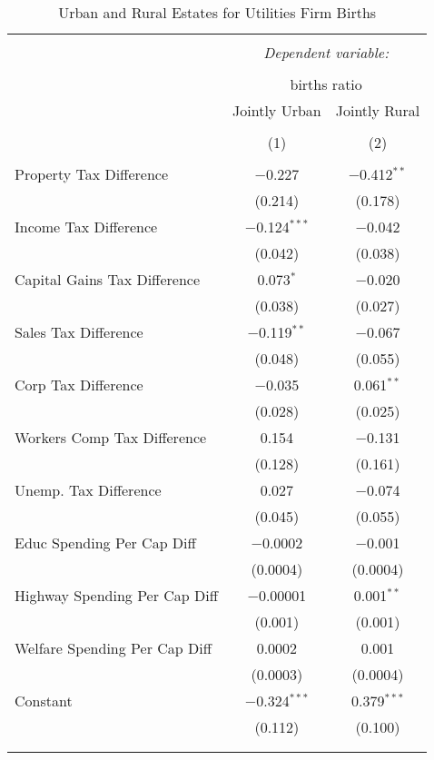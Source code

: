 
\begin{table}[!htbp] \centering 
  \caption{Urban and Rural Estates for  Utilities Firm Births} 
  \label{} 
\begin{tabular}{@{\extracolsep{5pt}}lcc} 
\\[-1.8ex]\hline 
\hline \\[-1.8ex] 
 & \multicolumn{2}{c}{\textit{Dependent variable:}} \\ 
\cline{2-3} 
\\[-1.8ex] & \multicolumn{2}{c}{births ratio} \\ 
 & Jointly Urban & Jointly Rural \\ 
\\[-1.8ex] & (1) & (2)\\ 
\hline \\[-1.8ex] 
 Property Tax Difference & $-$0.227 & $-$0.412$^{**}$ \\ 
  & (0.214) & (0.178) \\ 
  Income Tax Difference & $-$0.124$^{***}$ & $-$0.042 \\ 
  & (0.042) & (0.038) \\ 
  Capital Gains Tax Difference & 0.073$^{*}$ & $-$0.020 \\ 
  & (0.038) & (0.027) \\ 
  Sales Tax Difference & $-$0.119$^{**}$ & $-$0.067 \\ 
  & (0.048) & (0.055) \\ 
  Corp Tax Difference & $-$0.035 & 0.061$^{**}$ \\ 
  & (0.028) & (0.025) \\ 
  Workers Comp Tax Difference & 0.154 & $-$0.131 \\ 
  & (0.128) & (0.161) \\ 
  Unemp. Tax Difference & 0.027 & $-$0.074 \\ 
  & (0.045) & (0.055) \\ 
  Educ Spending Per Cap Diff & $-$0.0002 & $-$0.001 \\ 
  & (0.0004) & (0.0004) \\ 
  Highway Spending Per Cap Diff & $-$0.00001 & 0.001$^{**}$ \\ 
  & (0.001) & (0.001) \\ 
  Welfare Spending Per Cap Diff & 0.0002 & 0.001 \\ 
  & (0.0003) & (0.0004) \\ 
  Constant & $-$0.324$^{***}$ & 0.379$^{***}$ \\ 
  & (0.112) & (0.100) \\ 
 \hline \\[-1.8ex] 
\hline 
\hline \\[-1.8ex] 
\end{tabular} 
\end{table} 
